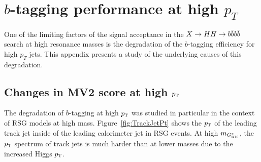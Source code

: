 \chapter{$b$-tagging performance at high $p_{T}$}
\label{AppendixB}

One of the limiting factors of the signal acceptance in the $X\to HH \to b\bar{b}b\bar{b}$ search at high resonance masses is the degradation of the $b$-tagging efficiency for high $p_{T}$ jets. This appendix presents a study of the underlying causes of this degradation. 





\section{Changes in MV2 score at high $p_{\textrm{\footnotesize\sc t}}$}

The degradation of $b$-tagging at high $p_{\textrm{\footnotesize\sc t}}$ was studied in particular in the context of RSG models at high mass. Figure~\ref{fig:TrackJetPt} shows the $p_{\textrm{\footnotesize\sc t}}$ of the leading track jet inside of the leading calorimeter jet in RSG events. At high $m_{G^*_{\rm KK}}$, the $p_{\textrm{\footnotesize\sc t}}$ spectrum of track jets is much harder than at lower masses due to the increased Higgs $p_{\textrm{\footnotesize\sc t}}$. 

